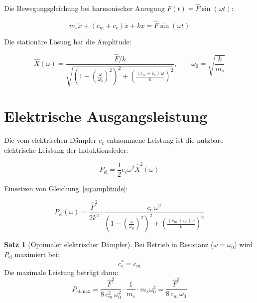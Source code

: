 ﻿\documentclass[12pt, a4paper]{report}
\theoremstyle{definition}
\newtheorem{theorem}{Satz}[section]
\theoremstyle{remark}
\begin{document}
Die Bewegungsgleichung bei harmonischer Anregung $F(t) = \hat{F}\sin(\omega t)$:

\begin{equation}
  m_s \ddot{x} + (c_m + c_e)\dot{x} + k x = \hat{F}\sin(\omega t)
  \label{eq:bewegungsgl}
\end{equation}

Die stationäre Lösung hat die Amplitude:

\begin{equation}
  \hat{X}(\omega) = \frac{\hat{F}/k}{\sqrt{\left(1 - \left(\frac{\omega}{\omega_0}\right)^2\right)^2
  + \left(\frac{(c_m + c_e)\,\omega}{k}\right)^2}}, \qquad
  \omega_0 = \sqrt{\frac{k}{m_s}}
  \label{eq:amplitude}
\end{equation}

\section{Elektrische Ausgangsleistung}

Die vom elektrischen Dämpfer $c_e$ entnommene Leistung ist die nutzbare
elektrische Leistung der Induktionsfeder:

\begin{equation}
  P_{\text{el}} = \frac{1}{2} c_e \omega^2 \hat{X}^2(\omega)
  \label{eq:p_el}
\end{equation}

Einsetzen von Gleichung~\eqref{eq:amplitude}:

\begin{equation}
  P_{\text{el}}(\omega) = \frac{\hat{F}^2}{2k^2} \cdot
  \frac{c_e\,\omega^2}{\left(1-\left(\frac{\omega}{\omega_0}\right)^2\right)^2
  + \left(\frac{(c_m+c_e)\omega}{k}\right)^2}
  \label{eq:p_el_full}
\end{equation}

\begin{theorem}[Optimaler elektrischer Dämpfer]
  \label{thm:opt_daempfer}
  Bei Betrieb in Resonanz ($\omega = \omega_0$) wird $P_{\text{el}}$ maximiert bei:
  \begin{equation}
    c_e^* = c_m
    \label{eq:ce_opt}
  \end{equation}
  Die maximale Leistung beträgt dann:
  \begin{equation}
    P_{\text{el,max}} = \frac{\hat{F}^2}{8\,c_m^2\,\omega_0^2}\cdot\frac{1}{m_s} \cdot m_s \omega_0^2
    = \frac{\hat{F}^2}{8\,c_m\,\omega_0}
    \label{eq:p_el_max}
  \end{equation}
\end{theorem}
\end{document}
